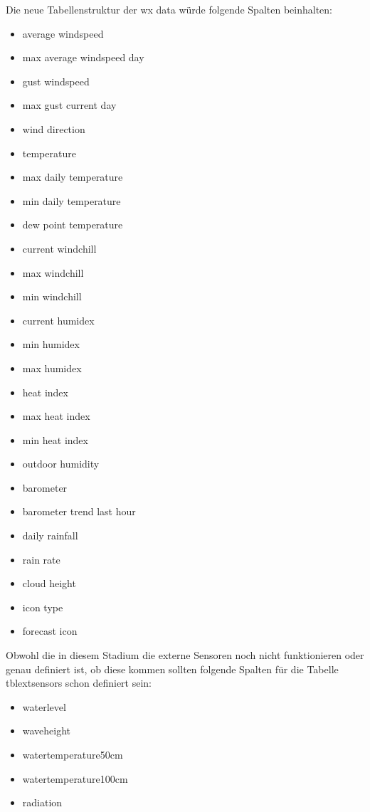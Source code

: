 Die neue Tabellenstruktur der wx data würde folgende Spalten beinhalten: 
 \begin{itemize}
\item average windspeed
\item max average windspeed day 
\item gust windspeed
\item max gust current day 
\item wind direction 
\item temperature  
\item max daily temperature 
\item min daily temperature  
\item dew point temperature 
\item current windchill  
\item max windchill 
\item min windchill
\item current humidex  
\item min humidex  
\item max humidex  
\item heat index 
\item max heat index 
\item min heat index 
\item outdoor humidity 
\item barometer 
\item barometer trend last hour 
\item daily rainfall  
\item rain rate  
\item cloud height  
\item icon type  
\item forecast icon
\end{itemize}

Obwohl die in diesem Stadium die externe Sensoren noch nicht funktionieren oder genau definiert ist, ob diese kommen sollten folgende Spalten für die Tabelle tblextsensors schon definiert sein: 
\begin{itemize}
\item waterlevel
\item waveheight
\item watertemperature50cm 
\item watertemperature100cm 
\item radiation
\end{itemize}

